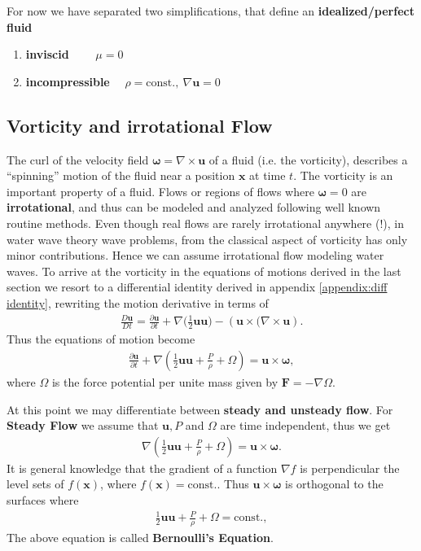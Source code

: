 For now we have separated two simplifications, that define an
\textbf{idealized/perfect fluid}
\begin{enumerate}
    \item \textbf{inviscid} $\qquad \mu=0$
    \item  \textbf{incompressible} $\quad \rho = \text{const.},\ \nabla \mathbf{u}=
        0$
\end{enumerate}
\subsection{Vorticity and irrotational Flow}
The curl of the velocity field $\mathbf{\omega} = \nabla \times \mathbf{u}$
of a fluid (i.e. the vorticity), describes a ``spinning'' motion of the fluid
near a position $\mathbf{x}$ at time $t$. The vorticity is an important
property of a fluid. Flows or regions of flows where $\mathbf{\omega}=0$ are
\textbf{irrotational}, and thus can be modeled and analyzed following well
known routine methods. Even though real flows are rarely irrotational
anywhere (!), in water wave theory wave problems, from the classical aspect
of vorticity has only minor contributions. Hence we can assume irrotational flow
modeling water waves. To arrive at the vorticity in the equations of motions
derived in the last section we resort to a differential identity derived in appendix
\ref{appendix:diff identity}, rewriting the motion derivative in terms of
\begin{align}
    \frac{D\mathbf{u}}{Dt} = \frac{\partial \mathbf{u}}{\partial t}
    +\nabla(\frac{1}{2}\mathbf{u}\mathbf{u)}
    - \left( \mathbf{u}\times (\nabla \times  \mathbf{u} \right).
\end{align}
Thus the equations of motion become
\begin{align}
    \frac{\partial \mathbf{u}}{\partial t} + \nabla\left(
    \frac{1}{2}\mathbf{u}\mathbf{u} + \frac{P}{\rho} + \Omega \right)
    = \mathbf{u} \times  \mathbf{\omega},
\end{align}
where $\Omega$ is the force potential per
unite mass given by $\mathbf{F} = -\nabla \Omega$.

At this point we may differentiate between \textbf{steady and unsteady flow}.
For \textbf{Steady Flow} we assume that $\mathbf{u}, P$ and $\Omega$ are time
independent, thus we get
\begin{align}
      \nabla\left( \frac{1}{2}\mathbf{u}\mathbf{u} + \frac{P}{\rho} + \Omega
      \right)  = \mathbf{u} \times  \mathbf{\omega}.
\end{align}
It is general knowledge that the gradient of a function $\nabla f$ is
perpendicular the level sets of $f(\mathbf{x})$, where $f(\mathbf{x}) =
\text{const.}$. Thus $\mathbf{u} \times  \mathbf{\omega}$ is orthogonal to
the surfaces  where
\begin{align} \label{eq:bernoulli}
    \frac{1}{2}\mathbf{u}\mathbf{u} + \frac{P}{\rho} + \Omega =
    \text{const.},
\end{align}
The above equation is called \textbf{Bernoulli's Equation}.


